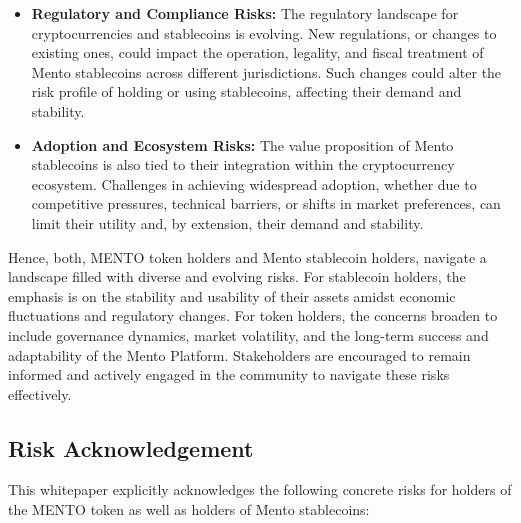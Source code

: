\documentclass[a4paper]{article}
\theoremstyle{definition}
\begin{document}
\begin{itemize}
        \item \textbf{Regulatory and Compliance Risks:} The regulatory landscape for cryptocurrencies and stablecoins is evolving. New regulations, or changes to existing ones, could impact the operation, legality, and fiscal treatment of Mento stablecoins across different jurisdictions. Such changes could alter the risk profile of holding or using stablecoins, affecting their demand and stability.
    
        \item \textbf{Adoption and Ecosystem Risks:} The value proposition of Mento stablecoins is also tied to their integration within the cryptocurrency ecosystem. Challenges in achieving widespread adoption, whether due to competitive pressures, technical barriers, or shifts in market preferences, can limit their utility and, by extension, their demand and stability.
    
    \end{itemize}

Hence, both, MENTO token holders and Mento stablecoin holders, navigate a landscape filled with diverse and evolving risks. For stablecoin holders, the emphasis is on the stability and usability of their assets amidst economic fluctuations and regulatory changes. For token holders, the concerns broaden to include governance dynamics, market volatility, and the long-term success and adaptability of the Mento Platform. Stakeholders are encouraged to remain informed and actively engaged in the community to navigate these risks effectively.

\subsection{Risk Acknowledgement}
This whitepaper explicitly acknowledges the following concrete risks for holders of the MENTO token as well as holders of Mento stablecoins:
\end{document}
